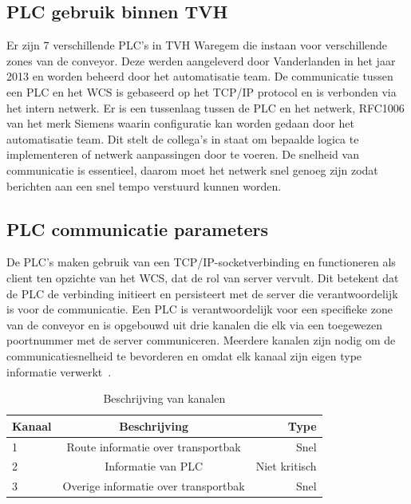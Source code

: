 \subsection{PLC gebruik binnen TVH}
Er zijn 7 verschillende PLC's in TVH Waregem die instaan voor verschillende zones van de conveyor.
Deze werden aangeleverd door Vanderlanden in het jaar 2013 en worden beheerd door het automatisatie team.
De communicatie tussen een PLC en het WCS is gebaseerd op het TCP/IP protocol en is verbonden via het intern netwerk.
Er is een tussenlaag tussen de PLC en het netwerk, RFC1006 van het merk Siemens waarin configuratie kan worden gedaan door het automatisatie team.
Dit stelt de collega's in staat om bepaalde logica te implementeren of netwerk aanpassingen door te voeren.
De snelheid van communicatie is essentieel, daarom moet het netwerk snel genoeg zijn zodat berichten aan een snel tempo verstuurd kunnen worden.

\subsection{PLC communicatie parameters}
De PLC's maken gebruik van een TCP/IP-socketverbinding en functioneren als client ten opzichte van het WCS, dat de rol van server vervult. 
Dit betekent dat de PLC de verbinding initieert en persisteert met de server die verantwoordelijk is voor de communicatie.
Een PLC is verantwoordelijk voor een specifieke zone van de conveyor en is opgebouwd uit drie kanalen die elk via een toegewezen poortnummer met de server communiceren. 
Meerdere kanalen zijn nodig om de communicatiesnelheid te bevorderen en omdat elk kanaal zijn eigen type informatie verwerkt~\autocite{Laar2013}.

\begin{table}
    \centering
    \begin{tabular}{lcr}
      \toprule
      \textbf{Kanaal} & \textbf{Beschrijving} & \textbf{Type}                \\
      \midrule
      1                & Route informatie over transportbak          & Snel           \\
      2                & Informatie van PLC                          & Niet kritisch  \\
      3                & Overige informatie over transportbak        & Snel           \\
      \bottomrule
    \end{tabular}
    \caption[Channel assignment]{\label{tab:channel-assignment}Beschrijving van kanalen}
  \end{table}

